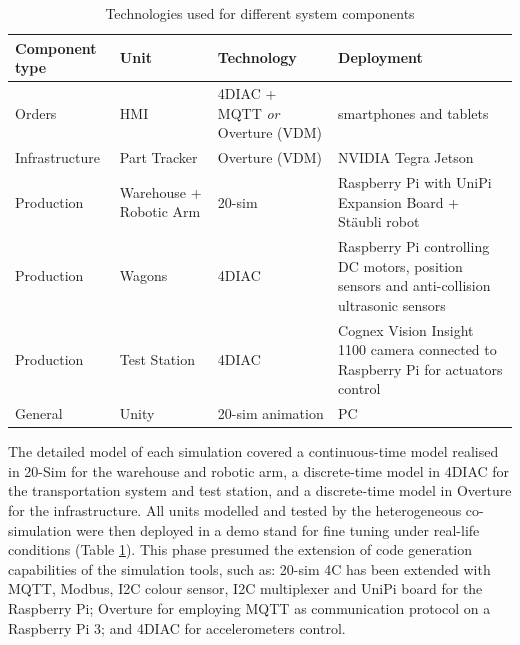 \begin{table}[ht]
	\centering
		\begin{tabular}{|p{2.4cm}|p{1.8cm}|p{3.2cm}|p{4cm}|}\hline
			\textbf{Component type} & \textbf{Unit} & \textbf{Technology} & \textbf{Deployment}\\
			\hline\hline
			Orders & HMI & 4DIAC + MQTT \textit{or} Overture (VDM) & smartphones and tablets \\ \hline
			Infrastructure & Part Tracker & Overture (VDM) & NVIDIA Tegra Jetson\\ \hline
			Production & Warehouse + Robotic Arm & 20-sim & Raspberry Pi with UniPi Expansion Board + Stäubli robot\\ \hline
			Production & Wagons & 4DIAC & Raspberry Pi controlling DC motors, position sensors and anti-collision ultrasonic sensors \\ \hline
			Production & Test Station & 4DIAC & Cognex Vision Insight 1100 camera connected to Raspberry Pi for actuators control\\ \hline
			General & Unity & 20-sim animation & PC\\\hline
		\end{tabular}
	\caption{Technologies used for different system components}
	\label{tab:iPP4CPPS_technologies}
\end{table}

The detailed model of each simulation covered a continuous-time model realised in 20-Sim for the warehouse and robotic arm, a discrete-time model in 4DIAC for the transportation system and test station, and a discrete-time model in Overture for the infrastructure. All units modelled and tested by the heterogeneous co-simulation were then deployed in a demo stand for fine tuning under real-life conditions (Table \ref{tab:iPP4CPPS_technologies}). This phase presumed the extension of code generation capabilities of the simulation tools, such as: 20-sim 4C has been extended with MQTT, Modbus, I2C colour sensor, I2C multiplexer and UniPi board for the Raspberry Pi; Overture for employing MQTT as communication protocol on a Raspberry Pi 3; and 4DIAC for accelerometers control. 

